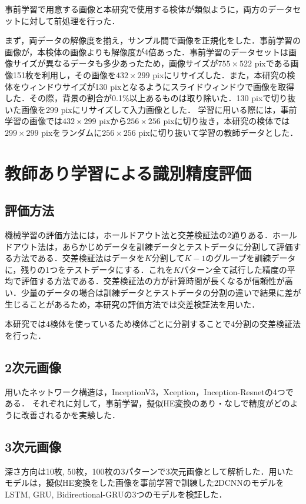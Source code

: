 事前学習で用意する画像と本研究で使用する検体が類似ように，両方のデータセットに対して前処理を行った．

まず，両データの解像度を揃え，サンプル間で画像を正規化をした．事前学習の画像が，本検体の画像よりも解像度が4倍あった．事前学習のデータセットは画像サイズが異なるデータも多少あったため，画像サイズが$755 \times 522$ pixである画像151枚を利用し，その画像を$432 \times 299$ pixにリサイズした．また，本研究の検体をウィンドウサイズが130 pixとなるようにスライドウィンドウで画像を取得した．その際，背景の割合が0.1\%以上あるものは取り除いた．130 pixで切り抜いた画像を299 pixにリサイズして入力画像とした．
学習に用いる際には，事前学習の画像では$432 \times 299$ pixから$256 \times 256$ pixに切り抜き，本研究の検体では$299 \times 299$ pixをランダムに$256 \times 256$ pixに切り抜いて学習の教師データとした．


\section{教師あり学習による識別精度評価}

\subsection{評価方法}
機械学習の評価方法には，ホールドアウト法と交差検証法の2通りある．ホールドアウト法は，あらかじめデータを訓練データとテストデータに分割して評価する方法である．交差検証法はデータを$K$分割して$K-1$のグループを訓練データに，残りの1つをテストデータにする．これを$K$パターン全て試行した精度の平均で評価する方法である．交差検証法の方が計算時間が長くなるが信頼性が高い．少量のデータの場合は訓練データとテストデータの分割の違いで結果に差が生じることがあるため，本研究の評価方法では交差検証法を用いた．

本研究では4検体を使っているため検体ごとに分割することで4分割の交差検証法を行った．

\subsection*{2次元画像}
用いたネットワーク構造は，InceptionV3，Xception，Inception-Resnetの4つである．
それぞれに対して，事前学習，擬似HE変換のあり・なしで精度がどのように改善されるかを実験した．

\subsection*{3次元画像}
深さ方向は10枚, 50枚，100枚の3パターンで3次元画像として解析した．用いたモデルは，擬似HE変換をした画像を事前学習で訓練した2DCNNのモデルをLSTM, GRU, Bidirectional-GRUの3つのモデルを検証した．


